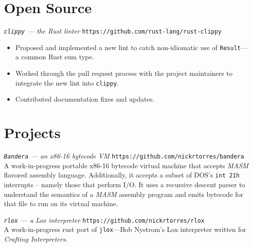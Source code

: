 \documentclass[margin]{res}
\begin{document}
\begin{resume}
\section{Open Source}
              {\sl \texttt{clippy} --- the Rust linter} \hfill \texttt{https://github.com/rust-lang/rust-clippy}
                 \begin{itemize}
                   \item Proposed and implemented a new lint to catch non-idiomatic use of
                   \texttt{Result}---a common Rust sum type.
                   \item Worked through the pull request process with the
                   project maintainers to integrate the new lint into
                   \texttt{clippy}.
                   \item Contributed documentation fixes and updates.
                 \end{itemize}
\section{Projects}
             {\sl \texttt{Bandera} --- an x86-16 bytecode VM} \hfill \texttt{https://github.com/nickrtorres/bandera}
             A work-in-progress portable x86-16 bytecode virtual machine that
             accepts \textit{MASM} flavored assembly language. Additionally, it accepts
             a subset of DOS's \texttt{int 21h} interrupts -- namely those that
             perform I/O. It uses a recursive descent parser to understand the
             semantics of a \textit{MASM} assembly program and emits bytecode for that
             file to run on its virtual machine.

             {\sl \texttt{rlox} --- a Lox interpreter} \hfill \texttt{https://github.com/nickrtorres/rlox} \\
             A work-in-progress rust port of \texttt{jlox}---Bob Nystrom's Lox interpreter
             written for {\sl Crafting Interpreters}.

\end{resume}
\end{document}
